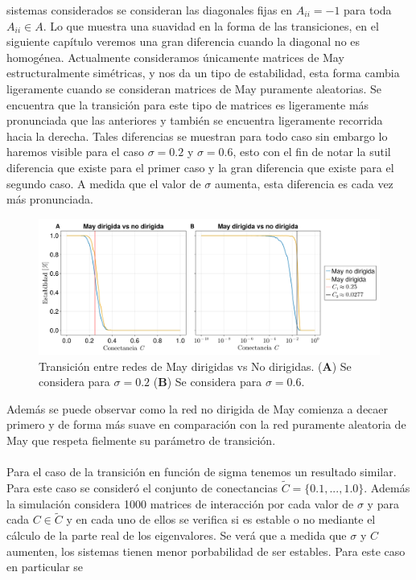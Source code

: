 sistemas considerados se consideran las diagonales fijas en $A_{ii}=-1$ para toda $A_{ii}\in A$. Lo que muestra una suavidad en la forma de las transiciones, en el siguiente capítulo veremos una gran diferencia cuando la diagonal no es homogénea. Actualmente consideramos únicamente matrices de May estructuralmente simétricas, y nos da un tipo de estabilidad, esta forma cambia ligeramente cuando se consideran matrices de May puramente aleatorias. Se encuentra que la transición para este tipo de matrices es ligeramente más pronunciada que las anteriores y también se encuentra ligeramente recorrida hacia la derecha. Tales diferencias se muestran para todo caso sin embargo lo haremos visible para el caso $\sigma= 0.2$ y $\sigma = 0.6$, esto con el fin de notar la sutil diferencia que existe para el primer caso y la gran diferencia que existe para el segundo caso. A medida que el valor de $\sigma$ aumenta, esta diferencia es cada vez más pronunciada.
\begin{figure}[h!]
	\centering
	\includegraphics[scale = 0.165]{../Imagenes/TransicionDirvsNoDir}
	\caption{Transición entre redes de May dirigidas vs No dirigidas. (\textbf{A}) Se considera para $\sigma = 0.2$ (\textbf{B}) Se considera para $\sigma=0.6$.}
	\label{fig:TransicionDirvsNoDir}
\end{figure}
Además se puede observar como la red no dirigida de May comienza a decaer primero y de forma más suave en comparación con la red puramente aleatoria de May que respeta fielmente su parámetro de transición.
\\
\\
Para el caso de la transición en función de sigma tenemos un resultado similar. Para este caso se consideró el conjunto de conectancias $\tilde{C}=\{0.1,...,1.0\}$. Además la simulación considera 1000 matrices de interacción por cada valor de $\sigma$ y para cada $C\in\tilde{C}$ y en cada uno de ellos se verifica si es estable o no mediante el cálculo de la parte real de los eigenvalores. Se verá que a medida que $\sigma$ y $C$ aumenten, los sistemas tienen menor porbabilidad de ser estables. Para este caso en particular se
